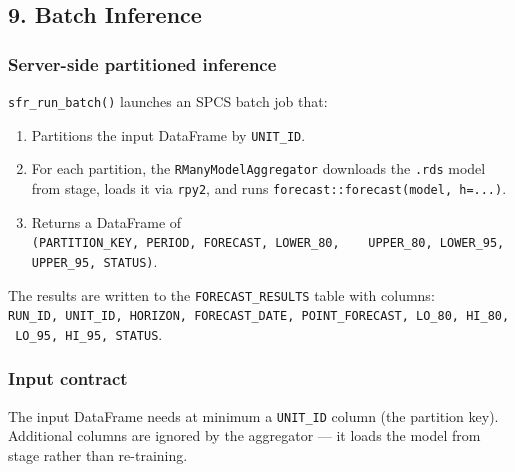 \documentclass[
]{article}
\newenvironment{Shaded}{\begin{snugshade}}{\end{snugshade}}
\newcommand{\AttributeTok}[1]{\textcolor[rgb]{0.13,0.29,0.53}{#1}}
\newcommand{\FunctionTok}[1]{\textcolor[rgb]{0.13,0.29,0.53}{\textbf{#1}}}
\newcommand{\NormalTok}[1]{#1}
\newcommand{\OtherTok}[1]{\textcolor[rgb]{0.56,0.35,0.01}{#1}}
\newcommand{\SpecialCharTok}[1]{\textcolor[rgb]{0.81,0.36,0.00}{\textbf{#1}}}
\providecommand{\tightlist}{%
  \setlength{\itemsep}{0pt}\setlength{\parskip}{0pt}}
\begin{document}
\subsection{9. Batch Inference}\label{batch-inference}

\subsubsection{Server-side partitioned
inference}\label{server-side-partitioned-inference}

\texttt{sfr\_run\_batch()} launches an SPCS batch job that:

\begin{enumerate}
\def\labelenumi{\arabic{enumi}.}
\tightlist
\item
  Partitions the input DataFrame by \texttt{UNIT\_ID}.
\item
  For each partition, the \texttt{RManyModelAggregator} downloads the
  \texttt{.rds} model from stage, loads it via \texttt{rpy2}, and runs
  \texttt{forecast::forecast(model,\ h=...)}.
\item
  Returns a DataFrame of
  \texttt{(PARTITION\_KEY,\ PERIOD,\ FORECAST,\ LOWER\_80,\ \ \ \ UPPER\_80,\ LOWER\_95,\ UPPER\_95,\ STATUS)}.
\end{enumerate}

\begin{Shaded}
\end{Shaded}

The results are written to the \texttt{FORECAST\_RESULTS} table with
columns:
\texttt{RUN\_ID,\ UNIT\_ID,\ HORIZON,\ FORECAST\_DATE,\ POINT\_FORECAST,\ LO\_80,\ HI\_80,\ LO\_95,\ HI\_95,\ STATUS}.

\subsubsection{Input contract}\label{input-contract}

The input DataFrame needs at minimum a \texttt{UNIT\_ID} column (the
partition key). Additional columns are ignored by the aggregator --- it
loads the model from stage rather than re-training.
\end{document}
